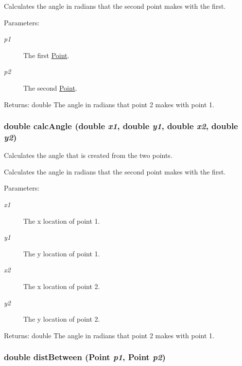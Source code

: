 Calculates the angle in radians that the second point makes with the first. \begin{Desc}
\item[Parameters:]
\begin{description}
\item[{\em p1}]The first \hyperlink{class_point}{Point}. \item[{\em p2}]The second \hyperlink{class_point}{Point}. \end{description}
\end{Desc}
\begin{Desc}
\item[Returns:]double The angle in radians that point 2 makes with point 1. \end{Desc}
\hypertarget{group__userclasses_g959fe7935c86672e48b4ac47324411a8}{
\subsubsection[{calcAngle}]{\setlength{\rightskip}{0pt plus 5cm}double calcAngle (double {\em x1}, \/  double {\em y1}, \/  double {\em x2}, \/  double {\em y2})}}
\label{group__userclasses_g959fe7935c86672e48b4ac47324411a8}


Calculates the angle that is created from the two points. 

Calculates the angle in radians that the second point makes with the first. \begin{Desc}
\item[Parameters:]
\begin{description}
\item[{\em x1}]The x location of point 1. \item[{\em y1}]The y location of point 1. \item[{\em x2}]The x location of point 2. \item[{\em y2}]The y location of point 2. \end{description}
\end{Desc}
\begin{Desc}
\item[Returns:]double The angle in radians that point 2 makes with point 1. \end{Desc}
\hypertarget{group__userclasses_g562b039a8c671376bd5033fd3739fc7f}{
\subsubsection[{distBetween}]{\setlength{\rightskip}{0pt plus 5cm}double distBetween ({\bf Point} {\em p1}, \/  {\bf Point} {\em p2})}}
\label{group__userclasses_g562b039a8c671376bd5033fd3739fc7f}


